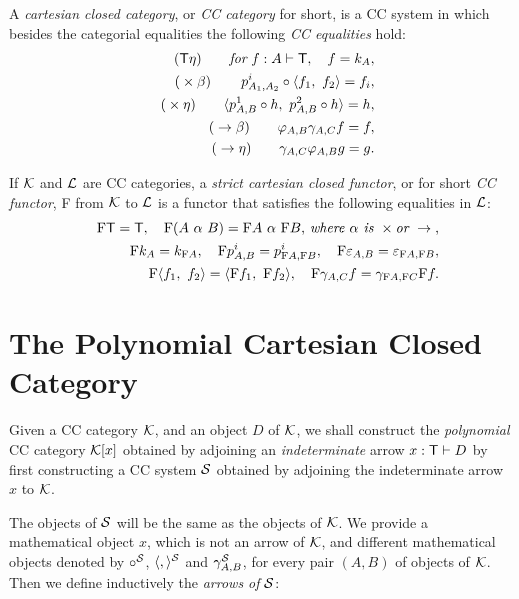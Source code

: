 A {\it cartesian closed category}, or {\it CC category} for short, is a CC
system in which besides the categorial equalities the following {\it CC
equalities} hold: 
\begin{eqnarray*}
&&\text{(}{\sf T}\eta \text{)}\qquad \text{{\it for}}{\it \ }f:A\vdash {\sf T%
},\quad f=k_{A},\bigskip \\
&&\text{(}\times \beta \text{)}\,\qquad p_{A_{1},A_{2}}^{i}\circ \langle
f_{1},~f_{2}\rangle =f_{i}, \\
&&\text{(}\times \eta \text{)}\qquad \langle p_{A,B}^{1}\circ
h,~p_{A,B}^{2}\circ h\rangle =h,\bigskip \\
&&\text{(}\rightarrow \beta \text{)}\qquad \varphi _{A,B}\gamma _{A,C}f=f, \\
&&\text{(}\rightarrow \eta \text{)}\qquad \gamma _{A,C}\varphi _{A,B}g=g.
\end{eqnarray*}

If ${\cal K}$ and ${\cal L}$ are CC categories, a {\it strict cartesian
closed functor}, or for short {\it CC functor}, F from ${\cal K}$ to ${\cal L%
}$ is a functor that satisfies the following equalities in ${\cal L}$: 
\begin{eqnarray*}
&&\text{F{\sf T}}=\text{{\sf T}},\quad \text{F}(A~\alpha ~B)=\text{F}%
A~\alpha ~\text{F}B\text{,{\it \ where }}\alpha \text{{\it \ is }}\times 
\text{{\it or} }\rightarrow \text{,} \\
&&\text{F}k_{A}=k_{\text{F}A},\quad \text{F}p_{A,B}^{i}=p_{\text{F}A,\text{F}%
B}^{i},\quad \text{F}\varepsilon _{A,B}=\varepsilon _{\text{F}A,\text{F}B},
\\
&&\text{F}\langle f_{1},~f_{2}\rangle =\langle \text{F}f_{1},~\text{F}%
f_{2}\rangle ,\quad \text{F}\gamma _{A,C}f=\gamma _{\text{F}A,\text{F}C}%
\text{F}f.
\end{eqnarray*}

\section{The Polynomial Cartesian Closed Category}

\noindent Given a CC category ${\cal K}$, and an object $D$ of ${\cal K}$,
we shall construct the {\it polynomial} CC category ${\cal K}[x]$ obtained
by adjoining an {\it indeterminate} arrow $x:{\sf T}\vdash D$ by first
constructing a CC system ${\cal S}$ obtained by adjoining the indeterminate
arrow $x$ to ${\cal K}$.

The objects of ${\cal S}$ will be the same as the objects of ${\cal K}$. We
provide a mathematical object $x$, which is not an arrow of ${\cal K}$, and
different mathematical objects denoted by $\circ ^{{\cal S}}$, $\langle
,\rangle ^{{\cal S}}$ and $\gamma _{A,B}^{{\cal S}}$, for every pair $(A,B)$
of objects of ${\cal K}$. Then we define inductively the {\it arrows of} $%
{\cal S}$:\medskip

